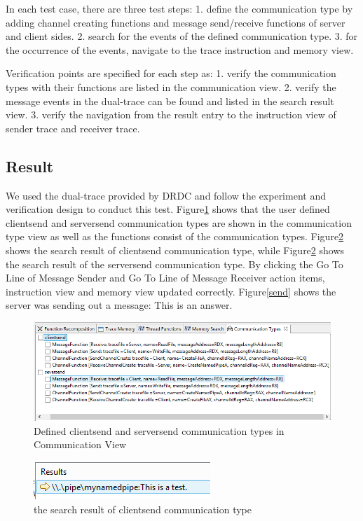 \documentclass[paper=a4, fontsize=11pt]{scrartcl}
\numberwithin{equation}{section}		%
\numberwithin{figure}{section}			%
\numberwithin{table}{section}				%
\begin{document}
In each test case, there are three test steps: 1. define the communication type by adding channel creating functions and message send/receive functions of server and client sides. 2. search for the events of  the defined communication type. 3. for the occurrence of the events, navigate to the trace instruction and memory view.

Verification points are specified for each step as: 1. verify the communication types with their functions are listed in the communication view. 2. verify the message events in the dual-trace can be found and listed in the search result view. 3. verify the navigation from the result entry to the instruction view of sender trace and receiver trace.
\subsection{Result}
We used the dual-trace provided by DRDC and follow the experiment and verification design to conduct this test. Figure\ref{addcomtyperesult} shows that the user defined clientsend and serversend communication types are shown in the communication type view as well as the functions consist of the communication types. Figure\ref{occclientresult} shows the search result of clientsend communication type, while Figure\ref{occclientresult} shows the search result of the serversend communication type. By clicking the Go To Line of Message Sender and Go To Line of Message Receiver action items, instruction view and memory view updated correctly. Figure\ref{send} shows the server was sending out a message: This is an answer. 


\begin{figure}[H]
\includegraphics[scale=.72]{addcomtyperesult}
 \caption{Defined clientsend and serversend communication types in Communication View}
\label{addcomtyperesult}
\end{figure}

\begin{figure}[H]
\includegraphics{occclientresult}
 \caption{the search result of clientsend communication type}
\label{occclientresult}
\end{figure}
\end{document}

